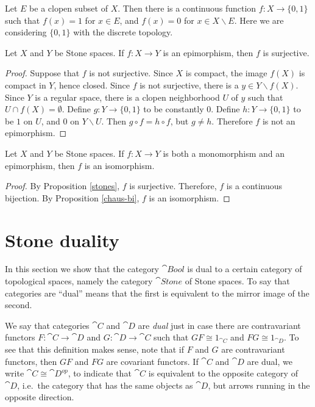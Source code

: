 \begin{note} Let $E$ be a clopen subset of $X$.  Then there is a
  continuous function $f:X\to \{ 0,1\}$ such that $f(x)=1$ for $x\in
  E$, and $f(x)=0$ for $x\in X\backslash E$.  Here we are considering
  $\{ 0,1\}$ with the discrete topology. \end{note}


\begin{prop} Let $X$ and $Y$ be Stone spaces.  If $f:X\to Y$ is an
  epimorphism, then $f$ is surjective. \label{stones} \end{prop}

\begin{proof} Suppose that $f$ is not surjective.  Since $X$ is
  compact, the image $f(X)$ is compact in $Y$, hence closed.  Since
  $f$ is not surjective, there is a $y\in Y\backslash f(X)$.  Since
  $Y$ is a regular space, there is a clopen neighborhood $U$ of $y$
  such that $U\cap f(X)=\emptyset$.  Define $g:Y\to \{ 0,1\}$ to be
  constantly $0$.  Define $h:Y\to \{ 0,1\}$ to be $1$ on $U$, and $0$
  on $Y\backslash U$.  Then $g\circ f=h\circ f$, but $g\neq h$.
  Therefore $f$ is not an epimorphism.
\end{proof}

\begin{prop} Let $X$ and $Y$ be Stone spaces.  If $f:X\to Y$ is both a
  monomorphism and an epimorphism, then $f$ is an
  isomorphism. \label{stone-balanced} \end{prop}

\begin{proof} By Proposition \ref{stones}, $f$ is surjective.
  Therefore, $f$ is a continuous bijection.  By Proposition
  \ref{chaus-bi}, $f$ is an isomorphism.
\end{proof}





\section{Stone duality} \label{sec:stone}

In this section we show that the category $\cat{Bool}$ is dual to a
certain category of topological spaces, namely the category
$\cat{Stone}$ of Stone spaces.  To say that categories are ``dual''
means that the first is equivalent to the mirror image of the second.

\begin{defn} We say that categories $\cat{C}$ and $\cat{D}$ are
  \emph{dual} just in case there are contravariant functors
  $F:\cat{C}\to\cat{D}$ and $G:\cat{D}\to\cat{C}$ such that $GF\cong
  1_{\cat{C}}$ and $FG\cong 1_{\cat{D}}$.  To see that this definition
  makes sense, note that if $F$ and $G$ are contravariant functors,
  then $GF$ and $FG$ are covariant functors.  If $\cat{C}$ and
  $\cat{D}$ are dual, we write $\cat{C}\cong \cat{D}^{op}$, to
  indicate that $\cat{C}$ is equivalent to the opposite category of
  $\cat{D}$, i.e.\ the category that has the same objects as
  $\cat{D}$, but arrows running in the opposite direction. \end{defn}


